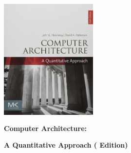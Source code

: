 \hfill
\begin{minipage}{.35\textwidth}
	\begin{center}
		\includegraphics[height=6cm]{introduction/images/comp_arch_quant_approach.jpg}
	\end{center}
	\centerline{\textbf{Computer Architecture:}}
	\centerline{\textbf{A Quantitative Approach ( Edition)}}
\end{minipage}

